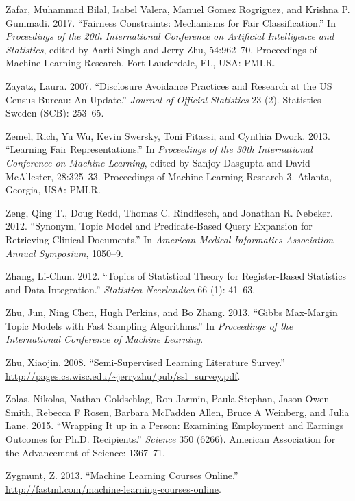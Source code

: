 \documentclass[]{krantz}
\begin{document}
\hypertarget{ref-zafar2017}{}
Zafar, Muhammad Bilal, Isabel Valera, Manuel Gomez Rogriguez, and
Krishna P. Gummadi. 2017. ``Fairness Constraints: Mechanisms for Fair
Classification.'' In \emph{Proceedings of the 20th International
Conference on Artificial Intelligence and Statistics}, edited by Aarti
Singh and Jerry Zhu, 54:962--70. Proceedings of Machine Learning
Research. Fort Lauderdale, FL, USA: PMLR.

\hypertarget{ref-zayatz2007disclosure}{}
Zayatz, Laura. 2007. ``Disclosure Avoidance Practices and Research at
the US Census Bureau: An Update.'' \emph{Journal of Official Statistics}
23 (2). Statistics Sweden (SCB): 253--65.

\hypertarget{ref-zemel2013}{}
Zemel, Rich, Yu Wu, Kevin Swersky, Toni Pitassi, and Cynthia Dwork.
2013. ``Learning Fair Representations.'' In \emph{Proceedings of the
30th International Conference on Machine Learning}, edited by Sanjoy
Dasgupta and David McAllester, 28:325--33. Proceedings of Machine
Learning Research 3. Atlanta, Georgia, USA: PMLR.

\hypertarget{ref-Zeng-2012}{}
Zeng, Qing T., Doug Redd, Thomas C. Rindflesch, and Jonathan R. Nebeker.
2012. ``Synonym, Topic Model and Predicate-Based Query Expansion for
Retrieving Clinical Documents.'' In \emph{American Medical Informatics
Association Annual Symposium}, 1050--9.

\hypertarget{ref-Zhang2012}{}
Zhang, Li-Chun. 2012. ``Topics of Statistical Theory for Register-Based
Statistics and Data Integration.'' \emph{Statistica Neerlandica} 66 (1):
41--63.

\hypertarget{ref-zhu-13}{}
Zhu, Jun, Ning Chen, Hugh Perkins, and Bo Zhang. 2013. ``Gibbs
Max-Margin Topic Models with Fast Sampling Algorithms.'' In
\emph{Proceedings of the International Conference of Machine Learning}.

\hypertarget{ref-zhu2005semi}{}
Zhu, Xiaojin. 2008. ``Semi-Supervised Learning Literature Survey.''
\url{http://pages.cs.wisc.edu/~jerryzhu/pub/ssl_survey.pdf}.

\hypertarget{ref-zolas2015wrapping}{}
Zolas, Nikolas, Nathan Goldschlag, Ron Jarmin, Paula Stephan, Jason
Owen-Smith, Rebecca F Rosen, Barbara McFadden Allen, Bruce A Weinberg,
and Julia Lane. 2015. ``Wrapping It up in a Person: Examining Employment
and Earnings Outcomes for Ph.D. Recipients.'' \emph{Science} 350 (6266).
American Association for the Advancement of Science: 1367--71.

\hypertarget{ref-MLcourses}{}
Zygmunt, Z. 2013. ``Machine Learning Courses Online.''
\url{http://fastml.com/machine-learning-courses-online}.
\end{document}
